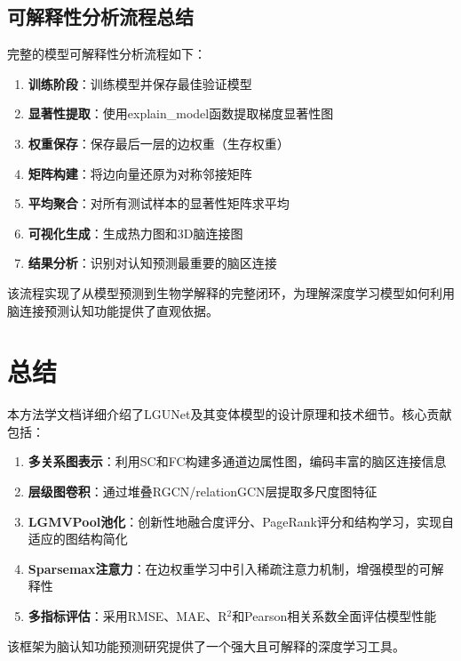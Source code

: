 \documentclass[UTF8, a4paper, 12pt]{article}
\begin{document}
\subsection{可解释性分析流程总结}

完整的模型可解释性分析流程如下：

\begin{enumerate}
    \item \textbf{训练阶段}：训练模型并保存最佳验证模型
    \item \textbf{显著性提取}：使用explain\_model函数提取梯度显著性图
    \item \textbf{权重保存}：保存最后一层的边权重（生存权重）
    \item \textbf{矩阵构建}：将边向量还原为对称邻接矩阵
    \item \textbf{平均聚合}：对所有测试样本的显著性矩阵求平均
    \item \textbf{可视化生成}：生成热力图和3D脑连接图
    \item \textbf{结果分析}：识别对认知预测最重要的脑区连接
\end{enumerate}

该流程实现了从模型预测到生物学解释的完整闭环，为理解深度学习模型如何利用脑连接预测认知功能提供了直观依据。

\newpage

\section{总结}

本方法学文档详细介绍了LGUNet及其变体模型的设计原理和技术细节。核心贡献包括：

\begin{enumerate}
    \item \textbf{多关系图表示}：利用SC和FC构建多通道边属性图，编码丰富的脑区连接信息
    \item \textbf{层级图卷积}：通过堆叠RGCN/relationGCN层提取多尺度图特征
    \item \textbf{LGMVPool池化}：创新性地融合度评分、PageRank评分和结构学习，实现自适应的图结构简化
    \item \textbf{Sparsemax注意力}：在边权重学习中引入稀疏注意力机制，增强模型的可解释性
    \item \textbf{多指标评估}：采用RMSE、MAE、R$^2$和Pearson相关系数全面评估模型性能
\end{enumerate}

该框架为脑认知功能预测研究提供了一个强大且可解释的深度学习工具。

\newpage
\end{document}
